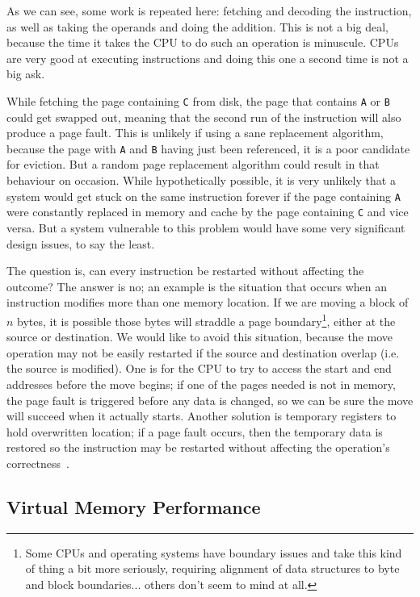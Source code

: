 As we can see, some work is repeated here: fetching and decoding the instruction, as well as taking the operands and doing the addition. This is not a big deal, because the time it takes the CPU to do such an operation is minuscule. CPUs are very good at executing instructions and doing this one a second time is not a big ask.

While fetching the page containing \texttt{C} from disk, the page that contains \texttt{A} or \texttt{B} could get swapped out, meaning that the second run of the instruction will also produce a page fault. This is unlikely if using a sane replacement algorithm, because the page with \texttt{A} and \texttt{B} having just been referenced, it is a poor candidate for eviction. But a random page replacement algorithm could result in that behaviour on occasion. While hypothetically possible, it is very unlikely that a system would get stuck on the same instruction forever if the page containing \texttt{A} were constantly replaced in memory and cache by the page containing \texttt{C} and vice versa. But a system vulnerable to this problem would have some very significant design issues, to say the least.

The question is, can every instruction be restarted without affecting the outcome? The answer is no; an example is the situation that occurs when an instruction modifies more than one memory location. If we are moving a block of $n$ bytes, it is possible those bytes will straddle a page boundary\footnote{Some CPUs and operating systems have boundary issues and take this kind of thing a bit more seriously, requiring alignment of data structures to byte and block boundaries... others don't seem to mind at all.}, either at the source or destination. We would like to avoid this situation, because the move operation may not be easily restarted if the source and destination overlap (i.e. the source is modified). One is for the CPU to try to access the start and end addresses before the move begins; if one of the pages needed is not in memory, the page fault is triggered before any data is changed, so we can be sure the move will succeed when it actually starts. Another solution is temporary registers to hold overwritten location; if a page fault occurs, then the temporary data is restored so the instruction may be restarted without affecting the operation's correctness~\cite{osc}.

\subsection*{Virtual Memory Performance}

